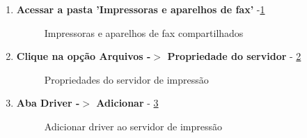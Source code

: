 \begin{enumerate}
	\item \textbf{Acessar a pasta 'Impressoras e aparelhos de fax'} -\ref{impressora_aparelho_fax}
	\begin{figure}[ht]
	   	\centering
	   	\caption{Impressoras e aparelhos de fax compartilhados}
	    \label{impressora_aparelho_fax}
	\end{figure}

	\item \textbf{Clique na opção Arquivos -$>$ Propriedade do servidor} - \ref{propriedade_servidor}
	\begin{figure}[ht]
	   	\centering
	   	\caption{Propriedades do servidor de impressão}
	    \label{propriedade_servidor}
	\end{figure}
	
 	\item \textbf{Aba Driver -$>$ Adicionar} - \ref{adicionar_driver}
	\begin{figure}[ht]
	   	\centering
	   	\caption{Adicionar driver ao servidor de impressão}
	    \label{adicionar_driver}
	\end{figure}
	

\end{enumerate}
